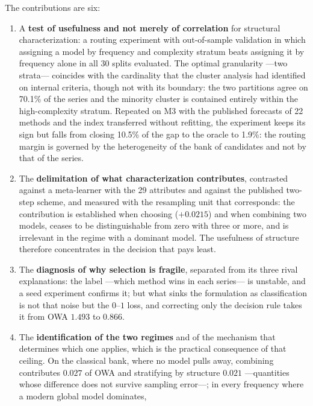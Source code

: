 The contributions are six:

\begin{enumerate}
\item A \textbf{test of usefulness and not merely of correlation} for structural
      characterization: a routing experiment with out-of-sample validation in which
      assigning a model by frequency and complexity stratum beats assigning it by
      frequency alone in all 30 splits evaluated. The optimal granularity ---two strata---
      coincides with the cardinality that the cluster analysis had identified on internal
      criteria, though not with its boundary: the two partitions agree on 70.1\% of the
      series and the minority cluster is contained entirely within the high-complexity
      stratum. Repeated on M3 with the published forecasts of 22 methods and the index
      transferred without refitting, the experiment keeps its sign but falls from closing
      10.5\% of the gap to the oracle to 1.9\%: the routing margin is governed by the
      heterogeneity of the bank of candidates and not by that of the series.
\item The \textbf{delimitation of what characterization contributes}, contrasted against a
      meta-learner with the 29 attributes and against the published two-step scheme, and
      measured with the resampling unit that corresponds: the contribution is established
      when choosing ($+0.0215$) and when combining two models, ceases to be
      distinguishable from zero with three or more, and is irrelevant in the regime with a
      dominant model. The usefulness of structure therefore concentrates in the decision
      that pays least.
\item The \textbf{diagnosis of why selection is fragile}, separated from its three rival
      explanations: the label ---which method wins in each series--- is unstable, and a
      seed experiment confirms it; but what sinks the formulation as classification is not
      that noise but the $0$--$1$ loss, and correcting only the decision rule takes it from
      OWA $1.493$ to $0.866$.
\item The \textbf{identification of the two regimes} and of the mechanism that determines
      which one applies, which is the practical consequence of that ceiling. On the
      classical bank, where no model pulls away, combining contributes $0.027$ of OWA and
      stratifying by structure $0.021$ ---quantities whose difference does not survive
      sampling error---; in every frequency where a modern global model dominates,

\end{enumerate}
